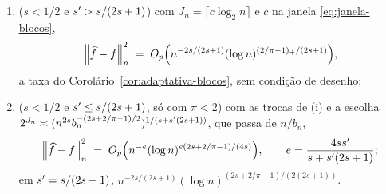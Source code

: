 \documentclass[11pt,a4paper]{article}
\newcommand{\Gcal}{\mathcal{G}}
\newcommand{\bn}{b_{n}}
\begin{document}
\begin{corollary}
\begin{enumerate}[label=\textup{(\roman*)}, leftmargin=*]
    $\thetastar$ com $\mathcal{R}_{\Gcal,1}(\thetastar;t) \ge tC_{g}$ (se
    $s > 1/2$) e um com $\mathcal{R}_{\Gcal,1}(\thetastar;t) \ge
    tC_{g}b^{-\vartheta_{\pi}}/2$ por nível fino $\lev < J$ com
    $2^{\lev} \le C_{g}b^{1-\vartheta_{\pi}}/t$ (se $s = 1/2$), da ordem de
    \eqref{eq:contagem-lenta}.
  \item \textup{($s < 1/2$ e $s' > s/(2s+1)$)} com $J_{n} = \lceil
    c\log_{2}n\rceil$ e $c$ na janela \eqref{eq:janela-blocos},
    \[
      \left\lVert \widehat f - f \right\rVert_{n}^{2}
      \;=\; O_{p}\Bigl(n^{-2s/(2s+1)}(\log n)^{(2/\pi-1)_{+}/(2s+1)}\Bigr),
    \]
    a taxa do Corolário~\ref{cor:adaptativa-blocos}, sem condição de desenho;
  \item \textup{($s < 1/2$ e $s' \le s/(2s+1)$, só com $\pi < 2$)} com as
    trocas de (i) e a escolha $2^{J_{n}} \asymp (n^{2s}\bn^{-(2s+2/\pi-1)/2})^{1/(s+\seff(2s+1))}$,
    que passa de $n/\bn$,
    \[
      \left\lVert \widehat f - f \right\rVert_{n}^{2}
      \;=\; O_{p}\Bigl(n^{-e}(\log n)^{e(2s+2/\pi-1)/(4s)}\Bigr),
      \qquad e = \frac{4ss'}{s+s'(2s+1)};
    \]
    em $s' = s/(2s+1)$, $n^{-2s/(2s+1)}(\log n)^{(2s+2/\pi-1)/(2(2s+1))}$.
\end{enumerate}
\end{corollary}
\end{document}
